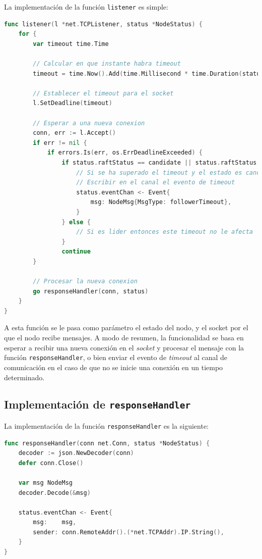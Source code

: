 La implementación de la función \texttt{listener} es simple:

\begin{lstlisting}[language=go]
func listener(l *net.TCPListener, status *NodeStatus) {
	for {
		var timeout time.Time
		
		// Calcular en que instante habra timeout
		timeout = time.Now().Add(time.Millisecond * time.Duration(status.electionTimeout))
		
		// Establecer el timeout para el socket
		l.SetDeadline(timeout)

		// Esperar a una nueva conexion
		conn, err := l.Accept()
		if err != nil {
			if errors.Is(err, os.ErrDeadlineExceeded) {
				if status.raftStatus == candidate || status.raftStatus == follower {
					// Si se ha superado el timeout y el estado es candidate o follower
					// Escribir en el canal el evento de timeout
					status.eventChan <- Event{
						msg: NodeMsg{MsgType: followerTimeout},
					}
				} else {
					// Si es lider entonces este timeout no le afecta
				}
				continue
		}
		
		// Procesar la nueva conexion
		go responseHandler(conn, status)
	}
}
\end{lstlisting}

A esta función se le pasa como parámetro el estado del nodo, y el socket por el que el nodo recibe mensajes. A modo de resumen, la funcionalidad se basa en esperar a recibir una nueva conexión en el \textit{socket} y procesar el mensaje con la función \texttt{responseHandler}, o bien enviar el evento de \textit{timeout} al canal de comunicación en el caso de que no se inicie una conexión en un tiempo determinado.

\subsection{Implementación de \texttt{responseHandler}}

La implementación de la función \texttt{responseHandler} es la siguiente:

\begin{lstlisting}[language=go]
func responseHandler(conn net.Conn, status *NodeStatus) {
	decoder := json.NewDecoder(conn)
	defer conn.Close()

	var msg NodeMsg
	decoder.Decode(&msg)
	
	status.eventChan <- Event{
		msg:    msg,
		sender: conn.RemoteAddr().(*net.TCPAddr).IP.String(),
	}
}
\end{lstlisting}

